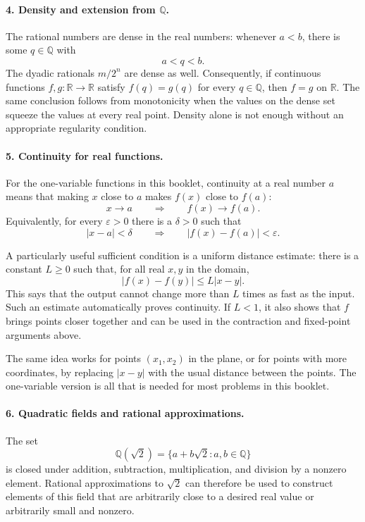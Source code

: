 \documentclass[12pt,a4paper]{article}
\begin{document}
\paragraph{4. Density and extension from $\mathbb Q$.}
The rational numbers are dense in the real numbers: whenever $a<b$, there is
some $q\in\mathbb Q$ with
\[
a<q<b.
\]
The dyadic rationals $m/2^n$ are dense as well. Consequently, if continuous
functions $f,g:\mathbb R\to\mathbb R$ satisfy $f(q)=g(q)$ for every
$q\in\mathbb Q$, then $f=g$ on $\mathbb R$. The same conclusion follows from
monotonicity when the values on the dense set squeeze the values at every
real point. Density alone is not enough without an appropriate regularity
condition.

\paragraph{5. Continuity for real functions.}
For the one-variable functions in this booklet, continuity at a real number
$a$ means that making $x$ close to $a$ makes $f(x)$ close to $f(a)$:
\[
x\to a\qquad\Longrightarrow\qquad f(x)\to f(a).
\]
Equivalently, for every $\varepsilon>0$ there is a $\delta>0$ such that
\[
|x-a|<\delta\qquad\Longrightarrow\qquad
|f(x)-f(a)|<\varepsilon.
\]

A particularly useful sufficient condition is a uniform distance estimate:
there is a constant $L\ge0$ such that, for all real $x,y$ in the domain,
\[
|f(x)-f(y)|\le L|x-y|.
\]
This says that the output cannot change more than $L$ times as fast as the
input. Such an estimate automatically proves continuity. If $L<1$, it also
shows that $f$ brings points closer together and can be used in the
contraction and fixed-point arguments above.

The same idea works for points $(x_1,x_2)$ in the plane, or for points with
more coordinates, by replacing $|x-y|$ with the usual distance between the
points. The one-variable version is all that is needed for most problems in
this booklet.

\paragraph{6. Quadratic fields and rational approximations.}
The set
\[
\mathbb Q(\sqrt2)=\{a+b\sqrt2:a,b\in\mathbb Q\}
\]
is closed under addition, subtraction, multiplication, and division by a
nonzero element. Rational approximations to $\sqrt2$ can therefore be used
to construct elements of this field that are arbitrarily close to a desired
real value or arbitrarily small and nonzero.
\end{document}
